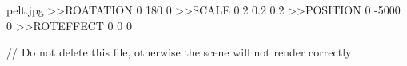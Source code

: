 pelt.jpg
>>ROATATION
0
180
0
>>SCALE
0.2
0.2
0.2
>>POSITION
0
-5000
0
>>ROTEFFECT
0
0
0

// Do not delete this file, otherwise the scene will not render correctly
